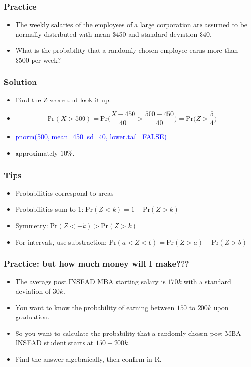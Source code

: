 \documentclass[xcolor=dvipsnames, 9pt]{beamer} %
\begin{document}
\begin{frame}
\frametitle{Practice}
\begin{itemize}
\item The weekly salaries of the employees of a large corporation are assumed to be normally distributed with mean \$450 and standard deviation \$40.
\item What is the probability that a randomly chosen employee earns more than \$500 per week?
\end{itemize}
\end{frame}

\begin{frame}
\frametitle{Solution}
\begin{itemize}
\item Find the Z score and look it up:
\item[] $$ \textrm{Pr}(X > 500) = \textrm{Pr} \bigg( \frac{X - 450}{40} > \frac{500-450}{40} \bigg) = \textrm{Pr} \bigg( Z > \frac{5}{4} \bigg) $$
\vspace{1em}
\item \textcolor{blue}{pnorm(500, mean=450, sd=40, lower.tail=FALSE)}
\item approximately $10\%$.
\end{itemize}
\end{frame}

\begin{frame}
\frametitle{Tips}
\begin{itemize}
	\itemsep\setlength{1em}
\item Probabilities correspond to areas
\item Probabilities sum to 1: $ \textrm{Pr}(Z < k) = 1 - \textrm{Pr}(Z > k) $
\item Symmetry: $\textrm{Pr}(Z < -k) > \textrm{Pr}(Z > k)$
\item For intervals, use substraction: $\textrm{Pr}(a < Z < b) = \textrm{Pr}(Z > a) - \textrm{Pr}(Z > b)$
\end{itemize}
\end{frame}

\begin{frame}
\frametitle{Practice: but how much money will I make??? }
\begin{itemize}
\item The average post INSEAD MBA starting salary is $170k$ with a standard deviation of $30k$. 
\item You want to know the probability of earning between $150$ to $200k$ upon graduation.
\item So you want to calculate the probability that a randomly chosen post-MBA INSEAD student starts at $150-200k$. 
\item Find the answer algebraically, then confirm in \textsf{R}.
\end{itemize}
\end{frame}
\end{document}
